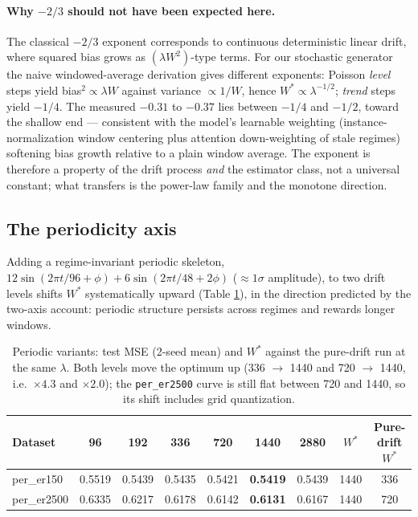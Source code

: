 \paragraph{Why $-2/3$ should not have been expected here.} The classical $-2/3$ exponent corresponds to continuous deterministic linear drift, where squared bias grows as $(\lambda W^2)$-type terms. For our stochastic generator the naive windowed-average derivation gives different exponents: Poisson \emph{level} steps yield bias$^2 \propto \lambda W$ against variance $\propto 1/W$, hence $W^* \propto \lambda^{-1/2}$; \emph{trend} steps yield $-1/4$. The measured $-0.31$ to $-0.37$ lies between $-1/4$ and $-1/2$, toward the shallow end --- consistent with the model's learnable weighting (instance-normalization window centering plus attention down-weighting of stale regimes) softening bias growth relative to a plain window average. The exponent is therefore a property of the drift process \emph{and} the estimator class, not a universal constant; what transfers is the power-law family and the monotone direction.

\subsection{The periodicity axis}

Adding a regime-invariant periodic skeleton, $12\sin(2\pi t/96 + \phi) + 6\sin(2\pi t/48 + 2\phi)$ ($\approx 1\sigma$ amplitude), to two drift levels shifts $W^*$ systematically upward (Table \ref{tab:p_axis}), in the direction predicted by the two-axis account: periodic structure persists across regimes and rewards longer windows.

\begin{table}[t]
\caption{Periodic variants: test MSE (2-seed mean) and $W^*$ against the pure-drift run at the same $\lambda$. Both levels move the optimum up (336 $\to$ 1440 and 720 $\to$ 1440, i.e.\ ${\times}4.3$ and ${\times}2.0$); the \texttt{per\_er2500} curve is still flat between 720 and 1440, so its shift includes grid quantization.}
\label{tab:p_axis}
\centering\small
\begin{tabular}{lcccccc cc}
\toprule
Dataset & 96 & 192 & 336 & 720 & 1440 & 2880 & $W^*$ & Pure-drift $W^*$ \\
\midrule
per\_er150 & 0.5519 & 0.5439 & 0.5435 & 0.5421 & \textbf{0.5419} & 0.5439 & 1440 & 336 \\
per\_er2500 & 0.6335 & 0.6217 & 0.6178 & 0.6142 & \textbf{0.6131} & 0.6167 & 1440 & 720 \\
\bottomrule
\end{tabular}
\end{table}

